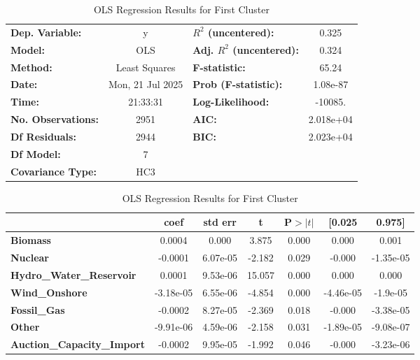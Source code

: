 \documentclass{article}
\begin{document}
\begin{table}[t]
\caption{OLS Regression Results for First Cluster}
\centering
\setlength\tabcolsep{3.5pt} %
\renewcommand{\arraystretch}{1.15}
\small

\begin{adjustbox}{max width=\columnwidth}
\begin{tabular}{lclc}
\toprule
\textbf{Dep. Variable:}    & y & \textbf{$R^2$ (uncentered):} & 0.325 \\
\textbf{Model:}            & OLS & \textbf{Adj. $R^2$ (uncentered):} & 0.324 \\
\textbf{Method:}           & Least Squares & \textbf{F-statistic:} & 65.24 \\
\textbf{Date:}             & Mon, 21 Jul 2025 & \textbf{Prob (F-statistic):} & 1.08e-87 \\
\textbf{Time:}             & 21:33:31 & \textbf{Log-Likelihood:} & -10085. \\
\textbf{No. Observations:} & 2951 & \textbf{AIC:} & 2.018e+04 \\
\textbf{Df Residuals:}     & 2944 & \textbf{BIC:} & 2.023e+04 \\
\textbf{Df Model:}         & 7 & & \\
\textbf{Covariance Type:}  & HC3 & & \\
\bottomrule
\end{tabular}
\end{adjustbox}

\vspace{0.6em}

\begin{adjustbox}{max width=\columnwidth}
\begin{tabular}{lcccccc}
 & \textbf{coef} & \textbf{std err} & \textbf{t} & \textbf{P$>|t|$} & \textbf{[0.025} & \textbf{0.975]}  \\
\midrule
\textbf{Biomass}                   & 0.0004  & 0.000     & 3.875  & 0.000 & 0.000 & 0.001 \\
\textbf{Nuclear}                   & -0.0001 & 6.07e-05 & -2.182 & 0.029 & -0.000 & -1.35e-05 \\
\textbf{Hydro\_Water\_Reservoir}   & 0.0001  & 9.53e-06 & 15.057 & 0.000 & 0.000 & 0.000 \\
\textbf{Wind\_Onshore}             & -3.18e-05 & 6.55e-06 & -4.854 & 0.000 & -4.46e-05 & -1.9e-05 \\
\textbf{Fossil\_Gas}               & -0.0002 & 8.27e-05 & -2.369 & 0.018 & -0.000 & -3.38e-05 \\
\textbf{Other}                     & -9.91e-06 & 4.59e-06 & -2.158 & 0.031 & -1.89e-05 & -9.08e-07 \\
\textbf{Auction\_Capacity\_Import} & -0.0002 & 9.95e-05 & -1.992 & 0.046 & -0.000 & -3.23e-06 \\
\bottomrule
\end{tabular}
\end{adjustbox}


\end{table}
\end{document}
